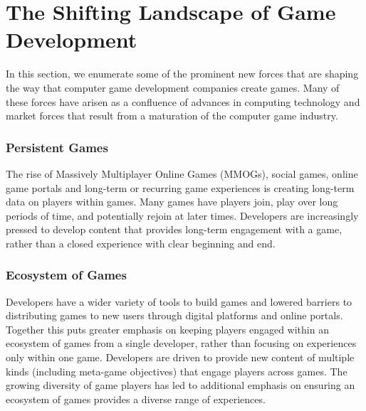 \documentclass[conference]{IEEEtran}
\begin{document}

\section{The Shifting Landscape of Game Development}

In this section, we enumerate some of the prominent new forces that are shaping the way that computer game development companies create games. 
Many of these forces have arisen as a confluence of advances in computing technology and market forces that result from a maturation of the computer game industry.

\subsubsection{Persistent Games} 
The rise of Massively Multiplayer Online Games (MMOGs), social games, online game portals and long-term or recurring game experiences is creating long-term data on players within games. 
Many games have players join, play over long periods of time, and potentially rejoin at later times. 
Developers are increasingly pressed to develop content that provides long-term engagement with a game, rather than a closed experience with clear beginning and end.

\subsubsection{Ecosystem of Games}
Developers have a wider variety of tools to build games and lowered barriers to distributing games to new users through digital platforms and online portals. 
Together this puts greater emphasis on keeping players engaged within an ecosystem of games from a single developer, rather than focusing on experiences only within one game. 
Developers are driven to provide new content of multiple kinds (including meta-game objectives) that engage players across games. 
The growing diversity of game players has led to additional emphasis on ensuring an ecosystem of games provides a diverse range of experiences.
\end{document}
